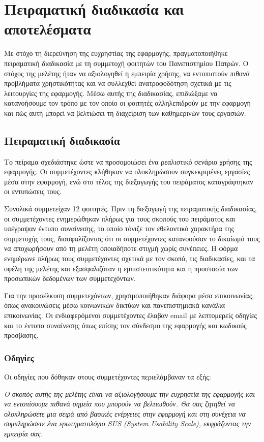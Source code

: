 \chapter{Πειραματική διαδικασία και αποτελέσματα}
    Με στόχο τη διερεύνηση της ευχρηστίας της εφαρμογής, πραγματοποιήθηκε πειραματική διαδικασία με τη συμμετοχή φοιτητών του Πανεπιστημίου Πατρών. Ο στόχος της μελέτης ήταν να αξιολογηθεί η εμπειρία χρήσης, να εντοπιστούν πιθανά προβλήματα χρηστικότητας και να συλλεχθεί ανατροφοδότηση σχετικά με τις λειτουργίες της εφαρμογής. Μέσω αυτής της διαδικασίας, επιδιώξαμε να κατανοήσουμε τον τρόπο με τον οποίο οι φοιτητές αλληλεπιδρούν με την εφαρμογή και πώς αυτή μπορεί να βελτιώσει τη διαχείριση των καθημερινών τους εργασιών.

    \section{Πειραματική διαδικασία}
        Το πείραμα σχεδιάστηκε ώστε να προσομοιώσει ένα ρεαλιστικό σενάριο χρήσης της εφαρμογής. Οι συμμετέχοντες κλήθηκαν να ολοκληρώσουν συγκεκριμένες εργασίες μέσα στην εφαρμογή, ενώ στο τέλος της διεξαγωγής του πειράματος καταγράφτηκαν οι εντυπώσεις τους.

        Συνολικά συμμετείχαν 12 φοιτητές. Πριν τη διεξαγωγή της πειραματικής διαδικασίας, οι συμμετέχοντες ενημερώθηκαν πλήρως για τους σκοπούς του πειράματος και υπέγραψαν έντυπο συναίνεσης, το οποίο τόνιζε τον εθελοντικό χαρακτήρα της συμμετοχής τους, διασφαλίζοντας ότι οι συμμετέχοντες κατανοούσαν το δικαίωμά τους να αποχωρήσουν από τη μελέτη οποιαδήποτε στιγμή χωρίς συνέπειες. Η φόρμα ενημέρωνε πλήρως τους συμμετέχοντες σχετικά με τον σκοπό, τις διαδικασίες, και τα οφέλη της μελέτης και εξασφαλιζόταν η εμπιστευτικότητα και η προστασία των προσωπικών δεδομένων των συμμετεχόντων.

        Για την προσέλκυση συμμετεχόντων, χρησιμοποιήθηκαν διάφορα μέσα επικοινωνίας, όπως ανακοινώσεις μέσω κοινωνικών δικτύων και πανεπιστημιακά κανάλια επικοινωνίας. Οι ενδιαφερόμενοι συμμετέχοντες έλαβαν email με λεπτομερείς οδηγίες και το έντυπο συναίνεσης όπως επίσης τον σύνδεσμο της εφαρμογής και κωδικούς πρόσβασης.

        \subsection{Οδηγίες}
            Οι οδηγίες που δόθηκαν στους συμμετέχοντες περιελάμβαναν τα εξής:

            \textit{Ο σκοπός αυτής της μελέτης είναι να αξιολογήσουμε την ευχρηστία της εφαρμογής και να εντοπίσουμε πιθανά σημεία που μπορούν να βελτιωθούν. Θα σας ζητηθεί να ολοκληρώσετε μια σειρά από βασικές ενέργειες στην εφαρμογή και στη συνέχεια να συμπληρώσετε ένα ερωτηματολόγιο SUS (System Usability Scale), εκφράζοντας την εμπειρία σας.}

